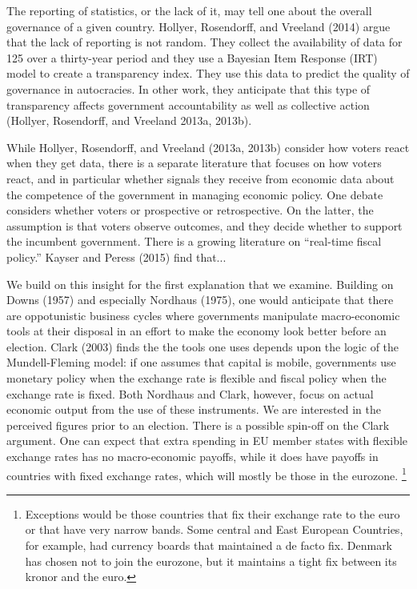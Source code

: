 \documentclass[]{article}
\begin{document}
The reporting of statistics, or the lack of it,  may tell one about the overall governance of a given country. Hollyer, Rosendorff, and Vreeland (2014) argue that the lack of reporting is not random. They collect the availability of data for 125 over a thirty-year period and they use a Bayesian Item Response  (IRT) model to create a transparency index.  They use this data to predict the quality of governance in autocracies. In other work, they anticipate that this type of transparency affects government accountability as well as collective action (Hollyer, Rosendorff, and Vreeland 2013a, 2013b).

While Hollyer, Rosendorff, and Vreeland (2013a, 2013b) consider how voters react when they get data, there is a separate literature that focuses on how voters react, and in particular whether signals they receive from economic data about the competence of the government in managing economic policy. One debate considers whether voters or prospective or retrospective. On the latter, the assumption is that voters observe outcomes, and they decide whether to support the incumbent government. There is a growing literature on “real-time fiscal policy.” Kayser and Peress (2015) find that...

We build on this insight for the first explanation that we examine. Building on Downs (1957) and especially Nordhaus (1975), one would anticipate that there are oppotunistic business cycles where governments manipulate macro-economic tools at their disposal in an effort to make the economy look better before an election. Clark (2003) finds the the tools one uses depends upon the logic of the Mundell-Fleming model: if one assumes that capital is mobile, governments use monetary policy when the exchange rate is flexible and fiscal policy when the exchange rate is fixed. Both Nordhaus and Clark, however, focus on actual economic output from the use of these instruments. We are interested in the perceived figures prior to an election. There is  a possible spin-off on the Clark argument. One can expect that extra spending in EU member states with flexible exchange rates has no macro-economic payoffs, while it does have payoffs in countries with fixed exchange rates, which will mostly be those in the eurozone. \footnote{Exceptions would be those countries that fix their exchange rate to the euro or that have very narrow bands. Some central and East European Countries, for example, had currency boards that maintained a de facto fix. Denmark has chosen not to join the eurozone, but it maintains a tight fix between its kronor and the euro.}
\end{document}
